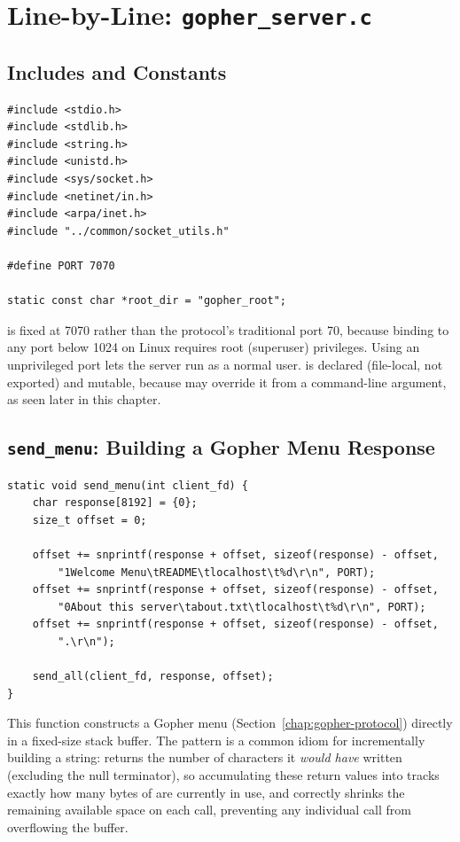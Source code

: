 \chapter{Line-by-Line: \texttt{gopher\_server.c}}
\label{chap:gopher-server}

\section{Includes and Constants}

\begin{lstlisting}[style=cstyle]
#include <stdio.h>
#include <stdlib.h>
#include <string.h>
#include <unistd.h>
#include <sys/socket.h>
#include <netinet/in.h>
#include <arpa/inet.h>
#include "../common/socket_utils.h"

#define PORT 7070

static const char *root_dir = "gopher_root";
\end{lstlisting}

 is fixed at 7070 rather than the protocol's traditional port 70, because binding to any port below 1024 on Linux requires root (superuser) privileges. Using an unprivileged port lets the server run as a normal user.  is declared  (file-local, not exported) and mutable, because  may override it from a command-line argument, as seen later in this chapter.

\section{\texttt{send\_menu}: Building a Gopher Menu Response}

\begin{lstlisting}[style=cstyle]
static void send_menu(int client_fd) {
    char response[8192] = {0};
    size_t offset = 0;

    offset += snprintf(response + offset, sizeof(response) - offset,
        "1Welcome Menu\tREADME\tlocalhost\t%d\r\n", PORT);
    offset += snprintf(response + offset, sizeof(response) - offset,
        "0About this server\tabout.txt\tlocalhost\t%d\r\n", PORT);
    offset += snprintf(response + offset, sizeof(response) - offset,
        ".\r\n");

    send_all(client_fd, response, offset);
}
\end{lstlisting}

This function constructs a Gopher menu (Section~\ref{chap:gopher-protocol}) directly in a fixed-size stack buffer. The  pattern is a common idiom for incrementally building a string:  returns the number of characters it \emph{would have} written (excluding the null terminator), so accumulating these return values into  tracks exactly how many bytes of  are currently in use, and  correctly shrinks the remaining available space on each call, preventing any individual  call from overflowing the buffer.

